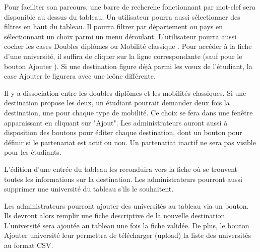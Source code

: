 Pour faciliter son parcours, une barre de recherche fonctionnant par mot-clef sera disponible au dessus du tableau. Un utilisateur pourra aussi sélectionner des filtres en haut du tableau. Il pourra filtrer par département ou pays en sélectionnant un choix parmi un menu déroulant. L'utilisateur pourra aussi cocher les cases \og Doubles diplômes\fg{} ou \og Mobilité classique \fg{}. Pour accéder à la fiche d'une université, il suffira de cliquer sur la ligne correspondante (sauf pour le bouton \og Ajouter \fg{}). Si une destination figure déjà parmi les vœux de l'étudiant, la case \og Ajouter \fg{} le figurera avec une icône différente.

Il y a dissociation entre les doubles diplômes et les mobilités classiques. Si une destination propose les deux, un étudiant pourrait demander deux fois la destination, une pour chaque type de mobilité. Ce choix se fera dans une fenêtre apparaissant en cliquant sur "Ajout". 
Les administrateurs auront aussi à disposition des boutons pour éditer chaque destination, dont un bouton pour définir si le partenariat est actif ou non. Un partenariat inactif ne sera pas visible pour les étudiants.

L'édition d'une entrée du tableau les reconduira vers la fiche où se trouvent toutes les informations sur la destination.
Les administrateurs pourront aussi supprimer une université du tableau s'ils le souhaitent.

Les administrateurs pourront ajouter des universités au tableau via un bouton. Ils devront alors remplir une fiche descriptive de la nouvelle destination. L'université sera ajoutée au tableau une fois la fiche validée. De plus, le bouton \og Ajouter université \fg{} leur permettra de télécharger (upload) la liste des universités au format CSV.
 
